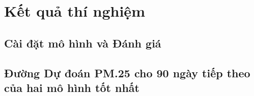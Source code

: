 \section{Kết quả thí nghiệm}
\subsection{Cài đặt mô hình và Đánh giá}










\subsection{Đường Dự đoán PM.25 cho 90 ngày tiếp theo của hai mô hình tốt nhất}















